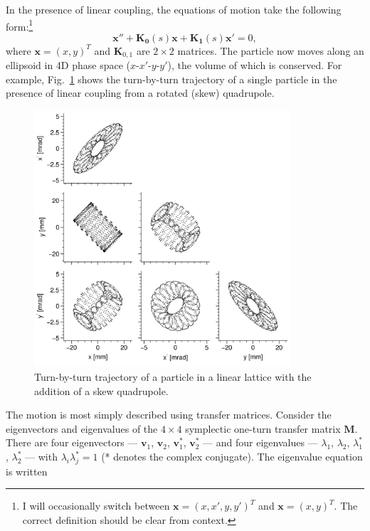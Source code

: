 In the presence of linear coupling, the equations of motion take the following form:\footnote{I will occasionally switch between $\mathbf{x} = (x, x', y, y')^T$ and $\mathbf{x} = (x, y)^T$. The correct definition should be clear from context.}
%
\begin{equation}\label{eq:single_particle_eom_coupled}
    \mathbf{x}'' + \mathbf{K_0}(s) \mathbf{x} + \mathbf{K_1}(s) \mathbf{x}' = 0,
\end{equation}
%
where $\mathbf{x} = (x, y)^T$ and $\mathbf{K}_{0, 1}$ are $2 \times 2$ matrices. The particle now moves along an ellipsoid in 4D phase space ($x$-$x'$-$y$-$y'$), the volume of which is conserved. For example, Fig.~\ref{fig:skew_quad_single_particle_tbt} shows the turn-by-turn trajectory of a single particle in the presence of linear coupling from a rotated (skew) quadrupole.
%
\begin{figure}[!p]
    \centering
    \includegraphics[width=0.85\textwidth]{Images/chapter1/skew_quad_single_particle_tbt.png}
    \caption{Turn-by-turn trajectory of a particle in a linear lattice with the addition of a skew quadrupole.}
    \label{fig:skew_quad_single_particle_tbt}
\end{figure}
%
The motion is most simply described using transfer matrices. Consider the eigenvectors and eigenvalues of the $4 \times 4$ symplectic one-turn transfer matrix $\mathbf{M}$. There are four eigenvectors — $\mathbf{v}_1$, $\mathbf{v}_2$, $\mathbf{v}_1^*$, $\mathbf{v}_2^*$ — and four eigenvalues — $\lambda_1$, $\lambda_2$, $\lambda_1^*$, $\lambda_2^*$ — with $\lambda_i\lambda_j^* = 1$ (* denotes the complex conjugate). The eigenvalue equation is written
